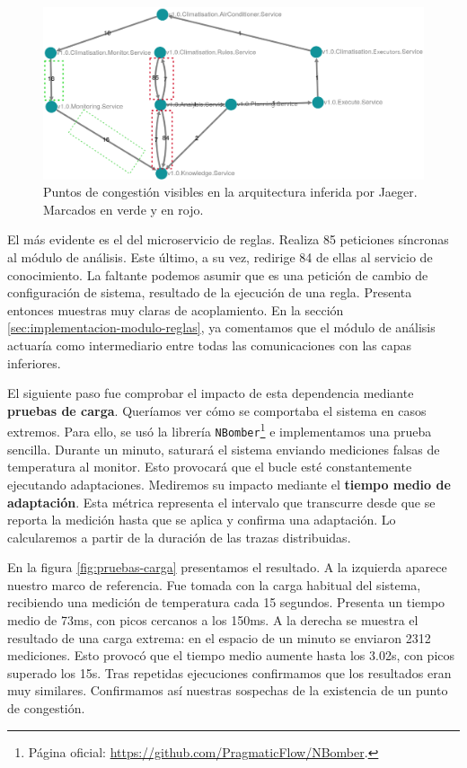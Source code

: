 \begin{figure}[htb]
  \hspace{1.25cm}
  \includegraphics[scale=0.3]{cap_despliegue/images/Pruebas-congestion}
  \caption{Puntos de congestión visibles en la arquitectura inferida por Jaeger. Marcados en verde y en rojo.}
  \label{fig:pruebas-congestion}
\end{figure}

El más evidente es el del microservicio de reglas. Realiza 85 peticiones síncronas al módulo de análisis. Este último, a su vez, redirige 84 de ellas al servicio de conocimiento. La faltante podemos asumir que es una petición de cambio de configuración de sistema, resultado de la ejecución de una regla. Presenta entonces muestras muy claras de acoplamiento. En la sección \ref{sec:implementacion-modulo-reglas}, ya comentamos que el módulo de análisis actuaría como intermediario entre todas las comunicaciones con las capas inferiores.

\pagebreak

El siguiente paso fue comprobar el impacto de esta dependencia mediante \textbf{pruebas de carga}. Queríamos ver cómo se comportaba el sistema en casos extremos. Para ello, se usó la librería \texttt{NBomber}\footnote{Página oficial: \url{https://github.com/PragmaticFlow/NBomber}.} e implementamos una prueba sencilla. Durante un minuto, saturará el sistema enviando mediciones falsas de temperatura al monitor. Esto provocará que el bucle esté constantemente ejecutando adaptaciones. Mediremos su impacto mediante el \textbf{tiempo medio de adaptación}. Esta métrica representa el intervalo que transcurre desde que se reporta la medición hasta que se aplica y confirma una adaptación. Lo calcularemos a partir de la duración de las trazas distribuidas.

En la figura \ref{fig:pruebas-carga} presentamos el resultado. A la izquierda aparece nuestro marco de referencia. Fue tomada con la carga habitual del sistema, recibiendo una medición de temperatura cada 15 segundos. Presenta un tiempo medio de 73ms, con picos cercanos a los 150ms. A la derecha se muestra el resultado de una carga extrema: en el espacio de un minuto se enviaron 2312 mediciones. Esto provocó que el tiempo medio aumente hasta los 3.02s, con picos superado los 15s. Tras repetidas ejecuciones confirmamos que los resultados eran muy similares. Confirmamos así nuestras sospechas de la existencia de un punto de congestión.

